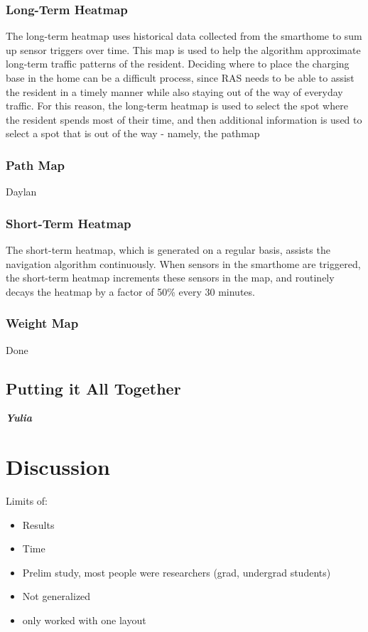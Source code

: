 \documentclass[11pt, conference, a4paper]{IEEEtran}
\begin{document}
\subsubsection{Long-Term Heatmap}
The long-term heatmap uses historical data collected from the smarthome to sum up sensor triggers over time. This map is used to help the algorithm approximate long-term traffic patterns of the resident. Deciding where to place the charging base in the home can be a difficult process, since RAS needs to be able to assist the resident in a timely manner while also staying out of the way of everyday traffic. For this reason, the long-term heatmap is used to select the spot where the resident spends most of their time, and then additional information is used to select a spot that is out of the way - namely, the pathmap


\subsubsection{Path Map}
Daylan


\subsubsection{Short-Term Heatmap}
The short-term heatmap, which is generated on a regular basis, assists the navigation algorithm continuously. When sensors in the smarthome are triggered, the short-term heatmap increments these sensors in the map, and routinely decays the heatmap by a factor of 50\% every 30 minutes. 


\subsubsection{Weight Map}
Done


\subsection{Putting it All Together}
\textit{\textbf{Yulia}}


\section{Discussion}
Limits of:
\begin{itemize}
    \item Results
    \item Time
    \item Prelim study, most people were researchers (grad, undergrad students)
    \item Not generalized
    \item only worked with one layout
\end{itemize}
\end{document}
